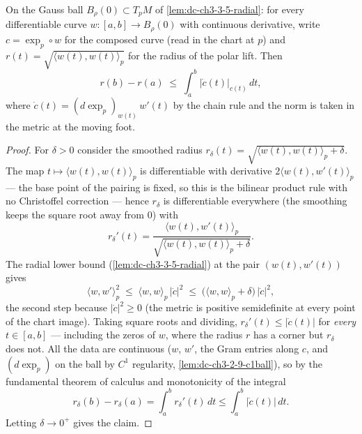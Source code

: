 \begin{lemma}
  \label{lem:dc-ch3-3-6-radius}


  On the Gauss ball $B_\rho(0)\subset T_pM$ of \cref{lem:dc-ch3-3-5-radial}: for
  every differentiable curve $w:[a,b]\to B_\rho(0)$ with continuous derivative,
  write $c=\exp_p\circ w$ for the composed curve (read in the chart at $p$) and
  $r(t)=\sqrt{\langle w(t),w(t)\rangle_p}$ for the radius of the polar lift.
  Then
  $$r(b)-r(a)\;\le\;\int_a^b\big|\dot c(t)\big|_{c(t)}\,dt,$$
  where $\dot c(t)=(d\exp_p)_{w(t)}\,w'(t)$ by the chain rule and the norm is
  taken in the metric at the moving foot.
\end{lemma}
\begin{proof}
  \sketch

  For $\delta>0$ consider the smoothed radius
  $r_\delta(t)=\sqrt{\langle w(t),w(t)\rangle_p+\delta}$. The map
  $t\mapsto\langle w(t),w(t)\rangle_p$ is differentiable with derivative
  $2\langle w(t),w'(t)\rangle_p$ — the base point of the pairing is fixed, so
  this is the bilinear product rule with no Christoffel correction — hence
  $r_\delta$ is differentiable everywhere (the smoothing keeps the square root
  away from $0$) with
  $$r_\delta'(t)=\frac{\langle w(t),w'(t)\rangle_p}
    {\sqrt{\langle w(t),w(t)\rangle_p+\delta}}.$$
  The radial lower bound (\cref{lem:dc-ch3-3-5-radial}) at the pair
  $(w(t),w'(t))$ gives
  $$\langle w,w'\rangle_p^2\;\le\;\langle w,w\rangle_p\,\big|\dot c\big|^2
    \;\le\;\big(\langle w,w\rangle_p+\delta\big)\,\big|\dot c\big|^2,$$
  the second step because $|\dot c|^2\ge 0$ (the metric is positive
  semidefinite at every point of the chart image). Taking square roots and
  dividing, $r_\delta'(t)\le|\dot c(t)|$ for \emph{every} $t\in[a,b]$ —
  including the zeros of $w$, where the radius $r$ has a corner but
  $r_\delta$ does not. All the data are continuous ($w$, $w'$, the Gram
  entries along $c$, and $(d\exp_p)$ on the ball by $C^1$ regularity,
  \cref{lem:dc-ch3-2-9-c1ball}), so by the fundamental theorem of calculus
  and monotonicity of the integral
  $$r_\delta(b)-r_\delta(a)=\int_a^b r_\delta'(t)\,dt
    \le\int_a^b\big|\dot c(t)\big|\,dt.$$
  Letting $\delta\to0^+$ gives the claim.
\end{proof}

